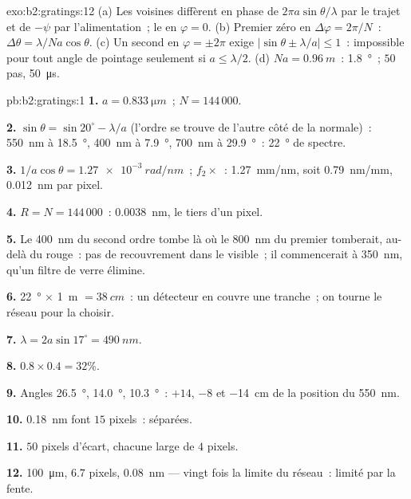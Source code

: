\begin{solution}{exo:b2:gratings:12}
(a) Les voisines diffèrent en phase de $2\pi a\sin\theta/\lambda$ par le trajet et de $-\psi$
par l'alimentation~; le  en $\varphi = 0$. (b) Premier zéro en
$\Delta\varphi = 2\pi/N$~: $\Delta\theta = \lambda/Na\cos\theta$. (c) Un second  en
$\varphi = \pm2\pi$ exige $|\sin\theta \pm \lambda/a| \le 1$~: impossible pour tout angle de
pointage seulement si $a \le \lambda/2$. (d) $Na = \qty{0.96}{m}$~: \qty{1.8}{\degree}~; $50$ pas,
\qty{50}{\micro s}.
\end{solution}

\begin{solution}{pb:b2:gratings:1}
\textbf{1.} $a = \qty{0.833}{\micro m}$~; $N = 144\,000$.

\textbf{2.} $\sin\theta = \sin20^\circ - \lambda/a$ (l'ordre se trouve de l'autre côté de
la normale)~: \qty{550}{nm} à \qty{18.5}{\degree}, \qty{400}{nm} à \qty{7.9}{\degree}, \qty{700}{nm} à
\qty{29.9}{\degree}~: \qty{22}{\degree} de spectre.

\textbf{3.} $1/a\cos\theta = \qty{1.27e-3}{rad/nm}$~; $f_2\times$~: \qty{1.27}{mm/nm}, soit
\qty{0.79}{nm/mm}, \qty{0.012}{nm} par pixel.

\textbf{4.} $R = N = 144\,000$~: \qty{0.0038}{nm}, le tiers d'un pixel.

\textbf{5.} Le \qty{400}{nm} du second ordre tombe là où le \qty{800}{nm} du premier
tomberait, au-delà du rouge~: pas de recouvrement dans le visible~; il commencerait
à \qty{350}{nm}, qu'un filtre de verre élimine.

\textbf{6.} \qty{22}{\degree} $\times$ \qty{1}{m} $= \qty{38}{cm}$~: un détecteur en couvre une tranche~;
on tourne le réseau pour la choisir.

\textbf{7.} $\lambda = 2a\sin17^\circ = \qty{490}{nm}$.

\textbf{8.} $0.8 \times 0.4 = 32\%$.

\textbf{9.} Angles \qty{26.5}{\degree}, \qty{14.0}{\degree}, \qty{10.3}{\degree}~: $+14$, $-8$ et
\qty{-14}{cm} de la position du \qty{550}{nm}.

\textbf{10.} \qty{0.18}{nm} font $15$ pixels~: séparées.

\textbf{11.} $50$ pixels d'écart, chacune large de $4$ pixels.

\textbf{12.} \qty{100}{\micro m}, $6.7$ pixels, \qty{0.08}{nm} --- vingt fois la
limite du réseau~: limité par la fente.


\end{solution}
